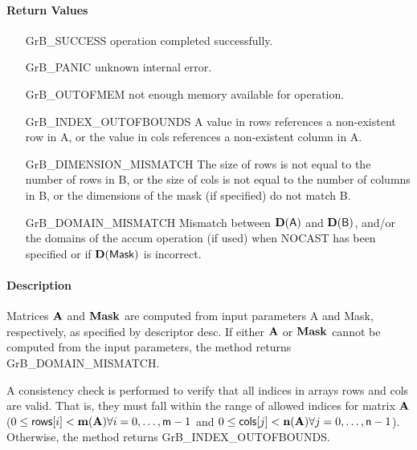 \paragraph{Return Values}


\begin{itemize}[leftmargin=2.1in]
\item[{\sf GrB\_SUCCESS}]     operation completed successfully.
\item[{\sf GrB\_PANIC}]        unknown internal error.
\item[{\sf GrB\_OUTOFMEM}]    not enough memory available for operation.
\item[{\sf GrB\_INDEX\_OUTOFBOUNDS}]
        A value in {\sf rows} references a non-existent row in {\sf A}, or
        the value in {\sf cols} references a non-existent column in {\sf A}.
\item[{\sf GrB\_DIMENSION\_MISMATCH}] 
        The size of {\sf rows} is not equal to the number of rows in {\sf B}, or
        the size of {\sf cols} is not equal to the number of columns in {\sf B}, or
        the dimensions of the mask (if specified) do not match {\sf B}.
\item[{\sf GrB\_DOMAIN\_MISMATCH}]    Mismatch between $\bold{D}({\sf A})$ and $\bold{D}({\sf B})$, and/or the domains of the 
                                      {\sf accum} operation (if used) when {\sf NOCAST} has
                                      been specified or if $\bold{D}(\sf Mask)$ is incorrect.
\end{itemize}


\paragraph{Description}

Matrices ${\bf A}$ and ${\bf Mask}$ are computed from input
parameters {\sf A} and {\sf Mask}, respectively, as specified by
descriptor {\sf desc}.  If either ${\bf A}$ or ${\bf Mask}$
cannot be computed from the input parameters, the method returns {\sf
GrB\_DOMAIN\_MISMATCH}.

A consistency check is performed to verify that all indices in arrays
{\sf rows} and {\sf cols} are valid. That is, they must fall within the range of allowed
indices for matrix ${\bf A}$ ($0 \leq {\sf rows}[i] < \bold{m}({\bf A})
\forall i = 0,\ldots,{\sf m}-1$ and
$0 \leq {\sf cols}[j] < \bold{n}({\bf A}) \forall j = 0,\ldots,{\sf n}-1$).  Otherwise, the method returns {\sf
GrB\_INDEX\_OUTOFBOUNDS}.

